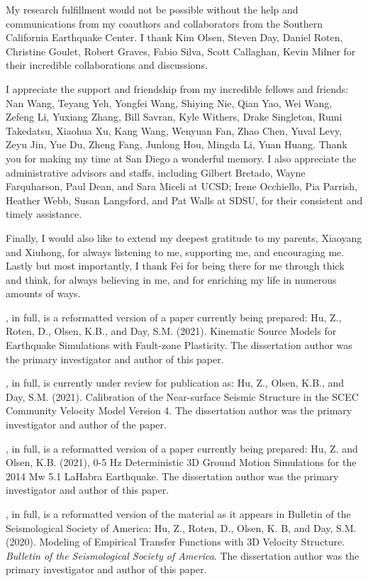\begin{frontmatter}
\begin{acknowledgements}
        My research fulfillment would not be possible without the help and communications from my coauthors and collaborators from the Southern California Earthquake Center. I thank Kim Olsen, Steven Day, Daniel Roten, Christine Goulet, Robert Graves, Fabio Silva, Scott Callaghan, Kevin Milner for their incredible collaborations and discussions.

        I appreciate the support and friendship from my incredible fellows and friends: Nan Wang, Teyang Yeh, Yongfei Wang, Shiying Nie, Qian Yao, Wei Wang, Zefeng Li, Yuxiang Zhang, Bill Savran, Kyle Withers, Drake Singleton, Rumi Takedatsu, Xiaohua Xu, Kang Wang, Wenyuan Fan, Zhao Chen, Yuval Levy, Zeyu Jin, Yue Du, Zheng Fang, Junlong Hou, Mingda Li, Yuan Huang. Thank you for making my time at San Diego a wonderful memory. I also appreciate the administrative advisors and staffs, including Gilbert Bretado, Wayne Farquharson, Paul Dean, and Sara Miceli at UCSD; Irene Occhiello, Pia Parrish, Heather Webb, Susan Langsford, and Pat Walls at SDSU, for their consistent and timely assistance.

        Finally, I would also like to extend my deepest gratitude to my parents, Xiaoyang and Xiuhong, for always listening to me, supporting me, and encouraging me. Lastly but most importantly, I thank Fei for being there for me through thick and think, for always believing in me, and for enriching my life in numerous amounts of ways.

        \bigskip

        , in full, is a reformatted version of a paper currently being prepared: Hu, Z., Roten, D., Olsen, K.B., and Day, S.M. (2021). Kinematic Source Models for Earthquake Simulations with Fault-zone Plasticity. The dissertation author was the primary investigator and author of this paper.

        , in full, is currently under review for publication as: Hu, Z., Olsen, K.B., and Day, S.M. (2021). Calibration of the Near-surface Seismic Structure in the SCEC Community Velocity Model Version 4. The dissertation author was the primary investigator and author of the paper.

        , in full, is a reformatted version of a paper currently being prepared: Hu, Z. and Olsen, K.B. (2021), 0-5 Hz Deterministic 3D Ground Motion Simulations for the 2014 Mw 5.1 LaHabra Earthquake. The dissertation author was the primary investigator and author of this paper.

        , in full, is a reformatted version of the material as it appears in Bulletin of the Seismological Society of America: Hu, Z., Roten, D., Olsen, K. B, and Day, S.M. (2020). Modeling of Empirical Transfer Functions with 3D Velocity Structure. \emph{Bulletin of the Seismological Society of America}.
        The dissertation author was the primary investigator and author of this paper.


\end{acknowledgements}
\end{frontmatter}
